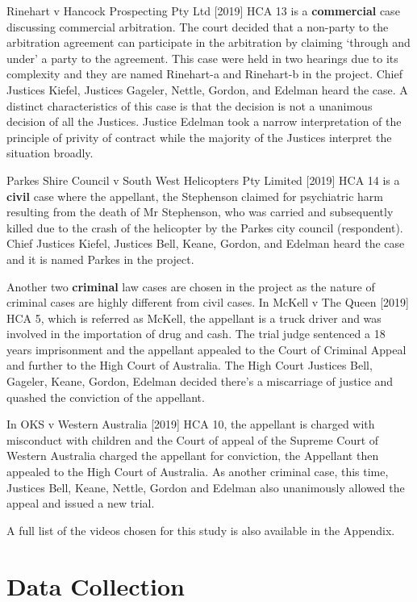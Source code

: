 \documentclass{monashthesis}
\begin{document}
Rinehart v Hancock Prospecting Pty Ltd {[}2019{]} HCA 13 is a \textbf{commercial} case discussing commercial arbitration. The court decided that a non-party to the arbitration agreement can participate in the arbitration by claiming `through and under' a party to the agreement. This case were held in two hearings due to its complexity and they are named Rinehart-a and Rinehart-b in the project. Chief Justices Kiefel, Justices Gageler, Nettle, Gordon, and Edelman heard the case. A distinct characteristics of this case is that the decision is not a unanimous decision of all the Justices. Justice Edelman took a narrow interpretation of the principle of privity of contract while the majority of the Justices interpret the situation broadly.

Parkes Shire Council v South West Helicopters Pty Limited {[}2019{]} HCA 14 is a \textbf{civil} case where the appellant, the Stephenson claimed for psychiatric harm resulting from the death of Mr Stephenson, who was carried and subsequently killed due to the crash of the helicopter by the Parkes city council (respondent). Chief Justices Kiefel, Justices Bell, Keane, Gordon, and Edelman heard the case and it is named Parkes in the project.

Another two \textbf{criminal} law cases are chosen in the project as the nature of criminal cases are highly different from civil cases. In McKell v The Queen {[}2019{]} HCA 5, which is referred as McKell, the appellant is a truck driver and was involved in the importation of drug and cash. The trial judge sentenced a 18 years imprisonment and the appellant appealed to the Court of Criminal Appeal and further to the High Court of Australia. The High Court Justices Bell, Gageler, Keane, Gordon, Edelman decided there's a miscarriage of justice and quashed the conviction of the appellant.

In OKS v Western Australia {[}2019{]} HCA 10, the appellant is charged with misconduct with children and the Court of appeal of the Supreme Court of Western Australia charged the appellant for conviction, the Appellant then appealed to the High Court of Australia. As another criminal case, this time, Justices Bell, Keane, Nettle, Gordon and Edelman also unanimously allowed the appeal and issued a new trial.

A full list of the videos chosen for this study is also available in the Appendix.

\let\cleardoublepage\clearpage

\hypertarget{data-collection}{%
\chapter{Data Collection}\label{data-collection}}
\end{document}
